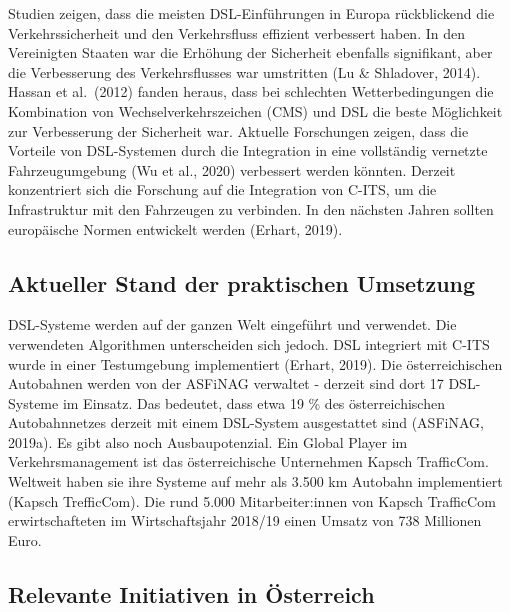 \documentclass[
]{book}
\begin{document}
Studien zeigen, dass die meisten DSL-Einführungen in Europa rückblickend die Verkehrssicherheit und den Verkehrsfluss effizient verbessert haben. In den Vereinigten Staaten war die Erhöhung der Sicherheit ebenfalls signifikant, aber die Verbesserung des Verkehrsflusses war umstritten (Lu \& Shladover, 2014). Hassan et al.~(2012) fanden heraus, dass bei schlechten Wetterbedingungen die Kombination von Wechselverkehrszeichen (CMS) und DSL die beste Möglichkeit zur Verbesserung der Sicherheit war. Aktuelle Forschungen zeigen, dass die Vorteile von DSL-Systemen durch die Integration in eine vollständig vernetzte Fahrzeugumgebung (Wu et al., 2020) verbessert werden könnten. Derzeit konzentriert sich die Forschung auf die Integration von C-ITS, um die Infrastruktur mit den Fahrzeugen zu verbinden. In den nächsten Jahren sollten europäische Normen entwickelt werden (Erhart, 2019).

\hypertarget{aktueller-stand-der-praktischen-umsetzung-14}{%
\subsection*{Aktueller Stand der praktischen Umsetzung}\label{aktueller-stand-der-praktischen-umsetzung-14}}

DSL-Systeme werden auf der ganzen Welt eingeführt und verwendet. Die verwendeten Algorithmen unterscheiden sich jedoch. DSL integriert mit C-ITS wurde in einer Testumgebung implementiert (Erhart, 2019). Die österreichischen Autobahnen werden von der ASFiNAG verwaltet - derzeit sind dort 17 DSL-Systeme im Einsatz. Das bedeutet, dass etwa 19 \% des österreichischen Autobahnnetzes derzeit mit einem DSL-System ausgestattet sind (ASFiNAG, 2019a). Es gibt also noch Ausbaupotenzial. Ein Global Player im Verkehrsmanagement ist das österreichische Unternehmen Kapsch TrafficCom. Weltweit haben sie ihre Systeme auf mehr als 3.500 km Autobahn implementiert (Kapsch TrefficCom). Die rund 5.000 Mitarbeiter:innen von Kapsch TrafficCom erwirtschafteten im Wirtschaftsjahr 2018/19 einen Umsatz von 738 Millionen Euro.

\hypertarget{relevante-initiativen-in-uxf6sterreich-14}{%
\subsection*{Relevante Initiativen in Österreich}\label{relevante-initiativen-in-uxf6sterreich-14}}
\end{document}

